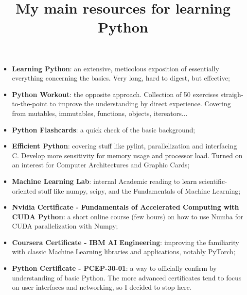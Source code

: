 \documentclass[10pt]{article}
\title {My main resources for learning Python}
\begin{document}
\maketitle

\begin{itemize}

\item{\textbf{Learning Python}}:
an extensive, meticolous exposition of essentially everything concerning
the basics. Very long, hard to digest, but effective;

\item{\textbf{Python Workout}}:
the opposite approach. Collection of 50 exercises straigh-to-the-point
to improve the understanding by direct experience.
Covering from mutables, immutables, functions, objects, itereators...

\item{\textbf{Python Flashcards}}:
a quick check of the basic background;

\item{\textbf{Efficient Python}}:
covering stuff like pylint, parallelization and interfacing C.
Develop more sensitivity for memory usage and processor load.
Turned on an interest for Computer Architectures and Graphic Cards;

\item{\textbf{Machine Learning Lab}}:
internal Academic reading to learn scientific-oriented stuff like numpy, scipy,
and the Fundamentals of Machine Learning;

\item{\textbf{Nvidia Certificate -
 Fundamentals of Accelerated Computing with CUDA Python}}:
a short online course (few hours) on how to use
Numba for CUDA parallelization with Numpy;

\item{\textbf{Coursera Certificate - IBM AI Engineering}}:
improving the familiarity with classic Machine Learning 
libraries and applications, notably PyTorch;

\item{\textbf{Python Certificate - PCEP-30-01}}:
a way to officially confirm by understanding of basic Python.
The more advanced certificates tend to focus on user interfaces
and networking, so I decided to stop here.

\end{itemize}
\end{document}
